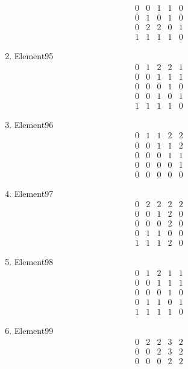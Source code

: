 \documentclass[12pt]{article}
\begin{document}
\begin{multicols}{3}
\begin{enumerate}
\begin{equation*}
\begin{array}{ccccc}
0&0&1&1&0\\
0&1&0&1&0\\
0&2&2&0&1\\
1&1&1&1&0
\end{array}
\end{equation*}
\item Element95
\begin{equation*}
\begin{array}{ccccc}
0&1&2&2&1\\
0&0&1&1&1\\
0&0&0&1&0\\
0&0&1&0&1\\
1&1&1&1&0
\end{array}
\end{equation*}
\item Element96
\begin{equation*}
\begin{array}{ccccc}
0&1&1&2&2\\
0&0&1&1&2\\
0&0&0&1&1\\
0&0&0&0&1\\
0&0&0&0&0
\end{array}
\end{equation*}
\item Element97
\begin{equation*}
\begin{array}{ccccc}
0&2&2&2&2\\
0&0&1&2&0\\
0&0&0&2&0\\
0&1&1&0&0\\
1&1&1&2&0
\end{array}
\end{equation*}
\item Element98
\begin{equation*}
\begin{array}{ccccc}
0&1&2&1&1\\
0&0&1&1&1\\
0&0&0&1&0\\
0&1&1&0&1\\
1&1&1&1&0
\end{array}
\end{equation*}
\item Element99
\begin{equation*}
\begin{array}{ccccc}
0&2&2&3&2\\
0&0&2&3&2\\
0&0&0&2&2\\

\end{array}
\end{equation*}
\end{enumerate}
\end{multicols}
\end{document}
